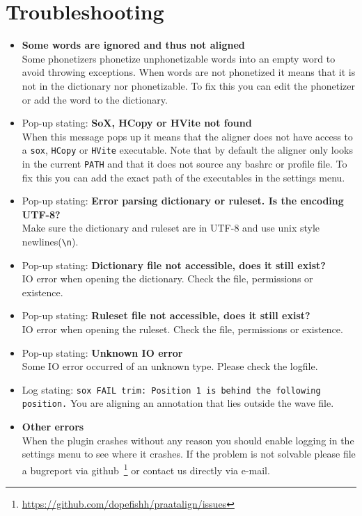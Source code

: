 \section{Troubleshooting}
\begin{itemize}
	\item \textbf{Some words are ignored and thus not aligned}\\
		Some phonetizers phonetize unphonetizable words into an empty word to avoid
		throwing exceptions. When words are not phonetized it means that it is not
		in the dictionary nor phonetizable. To fix this you can edit the phonetizer
		or add the word to the dictionary.
	\item Pop-up stating: \textbf{SoX, HCopy or HVite not found}\\
		When this message pops up it means that the aligner does not have access to
		a \texttt{sox}, \texttt{HCopy} or \texttt{HVite} executable. Note that by
		default the aligner only looks in the current \texttt{PATH} and that it
		does not source any bashrc or profile file. To fix this you can add the
		exact path of the executables in the settings menu.
	\item Pop-up stating: \textbf{Error parsing dictionary or ruleset. Is the
		encoding UTF-8?}\\
		Make sure the dictionary and ruleset are in UTF-8 and use unix style
		newlines(\texttt{\textbackslash n}).
	\item Pop-up stating: \textbf{Dictionary file not accessible, does it still
		exist?}\\
		IO error when opening the dictionary. Check the file, permissions or
		existence.
	\item Pop-up stating: \textbf{Ruleset file not accessible, does it still
		exist?}\\
		IO error when opening the ruleset. Check the file, permissions or
		existence.
	\item Pop-up stating: \textbf{Unknown IO error}\\
		Some IO error occurred of an unknown type. Please check the logfile.
	\item Log stating: \texttt{sox FAIL trim: Position 1 is behind the
		following position.}
		You are aligning an annotation that lies outside the wave file.
	\item \textbf{Other errors}\\
		When the plugin crashes without any reason you should enable logging in the
		settings menu to see where it crashes. If the problem is not solvable
		please file a bugreport via
		github~\footnote{\url{https://github.com/dopefishh/praatalign/issues}} or
		contact us directly via e-mail.
\end{itemize}


